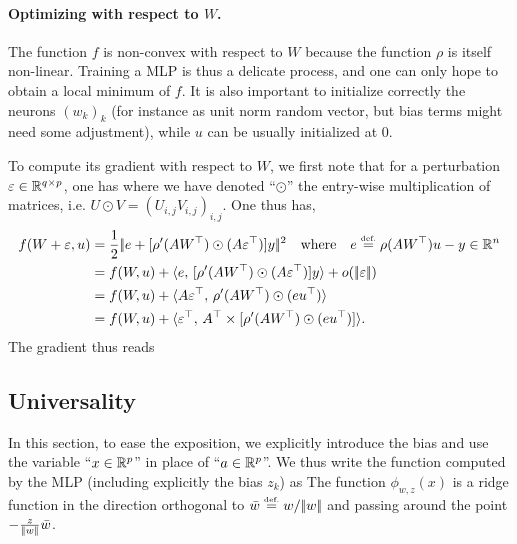 \paragraph{Optimizing with respect to $W$.}

The function $f$ is non-convex with respect to $W$ because the function $\rho$ is itself non-linear. 
%
Training a MLP is thus a delicate process, and one can only hope to obtain a local minimum of $f$. It is also important to initialize correctly the neurons $(w_k)_k$ (for instance as unit norm random vector, but bias terms might need some adjustment), while $u$ can be usually initialized at $0$.

To compute its gradient with respect to $W$, we first note that for a perturbation $\varepsilon \in \mathbb{R}^{q \times p}$, one has 
where we have denoted ``$\odot$'' the entry-wise multiplication of matrices, i.e. $U \odot V = (U_{i,j} V_{i,j})_{i,j}$.
%
One thus has, 
\begin{align*}
	f(W+\varepsilon,u) &= \frac{1}{2}|\!| e+[\rho'(AW^\top)\odot(A\varepsilon^\top)] y |\!|^2
		\quad \text{where} \quad e \stackrel{\mbox{\upshape\tiny def.}}{=} \rho(AW^\top) u - y \in \mathbb{R}^n \\
		&= f(W,u) + \langle e,\,[\rho'(AW^\top)\odot(A\varepsilon^\top)] y\rangle + o(|\!| \varepsilon |\!|) \\
		&= f(W,u) + \langle A \varepsilon^\top,\,\rho'(AW^\top)\odot (e u^\top)\rangle \\
		&= f(W,u) + \langle \varepsilon^\top,\,A^\top \times [\rho'(AW^\top)\odot (e u^\top)]\rangle.
\end{align*}
The gradient thus reads

\subsection{Universality}
\label{sec-universality}

In this section, to ease the exposition, we explicitly introduce the bias and use the variable ``$x \in \mathbb{R}^p$'' in place of ``$a \in \mathbb{R}^p$''. We thus write the function computed by the MLP (including explicitly the bias $z_k$) as 
The function $\phi_{w,z}(x)$ is a ridge function in the direction orthogonal to $\bar w \stackrel{\mbox{\upshape\tiny def.}}{=} w/|\!| w |\!|$ and passing around the point $-\frac{z}{|\!| w |\!|}\bar w$.

